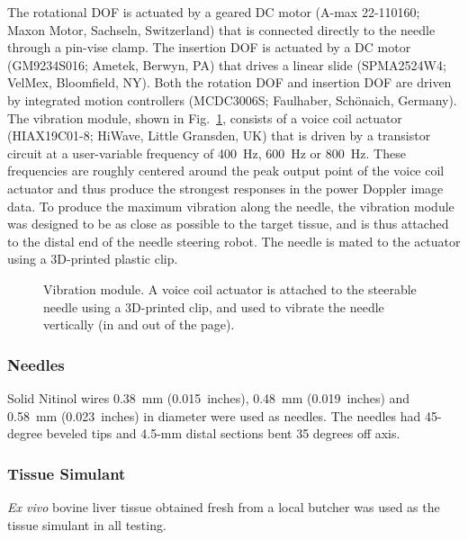 The rotational DOF is actuated by a geared DC motor (A-max 22-110160; Maxon Motor, Sachseln, Switzerland) that is connected directly to the needle through a pin-vise clamp. The insertion DOF is actuated by a DC motor (GM9234S016; Ametek, Berwyn, PA) that drives a linear slide (SPMA2524W4; VelMex, Bloomfield, NY). Both the rotation DOF and insertion DOF are driven by integrated motion controllers (MCDC3006S; Faulhaber, Schönaich, Germany). The vibration module, shown in Fig.~\ref{fig:Vibrator}, consists of a voice coil actuator (HIAX19C01-8; HiWave, Little Gransden, UK) that is driven by a transistor circuit at a user-variable frequency of 400~Hz, 600~Hz or 800~Hz. These frequencies are roughly centered around the peak output point of the voice coil actuator and thus produce the strongest responses in the power Doppler image data. To produce the maximum vibration along the needle, the vibration module was designed to be as close as possible to the target tissue, and is thus attached to the distal end of the needle steering robot. The needle is mated to the actuator using a 3D-printed plastic clip.

\begin{figure}[!t]
\caption[Vibration module]{Vibration module. A voice coil actuator is attached to the steerable needle using a 3D-printed clip, and used to vibrate the needle vertically (in and out of the page).}
\label{fig:Vibrator}
\end{figure}

\subsubsection{Needles}
Solid Nitinol wires 0.38~mm (0.015~inches), 0.48~mm (0.019~inches) and 0.58~mm (0.023~inches) in diameter were used as needles. The needles had 45-degree beveled tips and 4.5-mm distal sections bent 35 degrees off axis.

\subsubsection{Tissue Simulant}
\textit{Ex vivo} bovine liver tissue obtained fresh from a local butcher was used as the tissue simulant in all testing.

